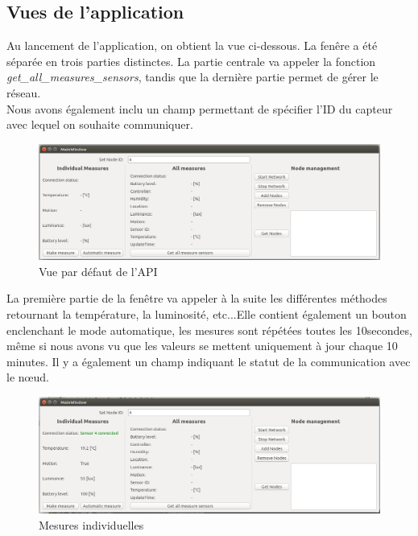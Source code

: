 \subsection{Vues de l'application}
Au lancement de l'application, on obtient la vue ci-dessous. La fenêre a été séparée en trois parties distinctes.  La partie centrale va appeler la fonction \textit{get\_all\_measures\_sensors}, tandis que la dernière partie permet de gérer le réseau.\\
Nous avons également inclu un champ permettant de spécifier l'ID du capteur avec lequel on souhaite communiquer.
\begin{figure}[H]
	\begin{center}
		\includegraphics[width=16cm]{img/api1.png}
		\caption{Vue par défaut de l'API}
		\label{api}
	\end{center}
\end{figure}
La première partie de la fenêtre va appeler à la suite les différentes méthodes retournant la température, la luminosité, etc...Elle contient également un bouton enclenchant le mode automatique, les mesures sont répétées toutes les 10secondes, même si nous avons vu que les valeurs se mettent uniquement à jour chaque 10 minutes. Il y a également un champ indiquant le statut de la communication avec le nœud.
\begin{figure}[H]
	\begin{center}
		\includegraphics[width=16cm]{img/api2.png}
		\caption{Mesures individuelles}
		\label{api2}
	\end{center}
\end{figure} 

